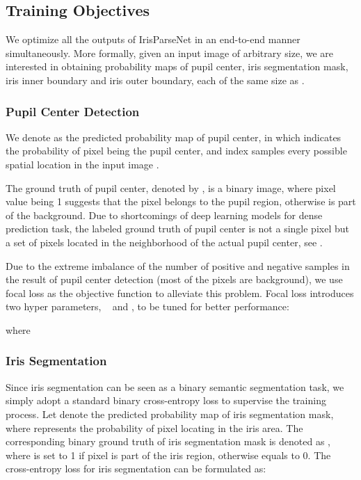 \documentclass[journal]{IEEEtran}
\begin{document}
\subsection{Training Objectives}
We optimize all the outputs of IrisParseNet in an end-to-end manner simultaneously. More formally, given an input image  of arbitrary size, we are interested in obtaining probability maps of pupil center, iris segmentation mask, iris inner boundary and iris outer boundary, each of the same size as .

\subsubsection{Pupil Center Detection}
We denote  as the predicted probability map of pupil center, in which  indicates the probability of pixel  being the pupil center, and index  samples every possible spatial location in the input image .

The ground truth of pupil center, denoted by , is a binary image, where pixel value  being 1 suggests that the pixel  belongs to the pupil region, otherwise is part of the background. Due to shortcomings of deep learning models for dense prediction task, the labeled ground truth of pupil center is not a single pixel but a set of pixels located in the neighborhood of the actual pupil center, see .

Due to the extreme imbalance of the number of positive and negative samples in the result of pupil center detection (most of the pixels are background), we use focal loss\cite{lin2017focal} as the objective function to alleviate this problem. Focal loss introduces two hyper parameters, \ie~ and , to be tuned for better performance:

 where


\subsubsection{Iris Segmentation}
Since iris segmentation can be seen as a binary semantic segmentation task, we simply adopt a standard binary cross-entropy loss to supervise the training process.
Let  denote the predicted probability map of iris segmentation mask, where  represents the probability of pixel  locating in the iris area.
The corresponding binary ground truth of iris segmentation mask is denoted as  , where  is set to 1 if pixel  is part of the iris region, otherwise  equals to 0. The cross-entropy loss for iris segmentation can be formulated as:
\end{document}

